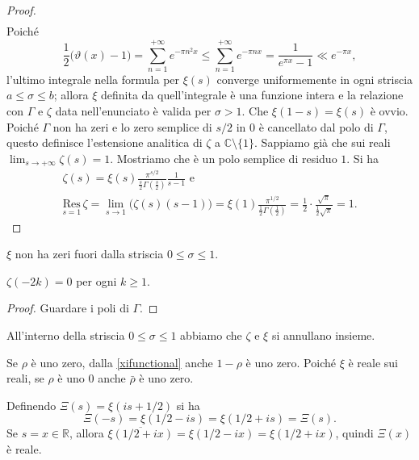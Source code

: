 \begin{proof}
\begin{gather*}
  \end{gather*}
  Poiché
  $$\frac{1}{2}\big(\vartheta(x)-1\big)=\sum_{n=1}^{+\infty} e^{-\pi n^2x} \le \sum_{n=1}^{+\infty} e^{-\pi nx}=\frac{1}{e^{\pi x}-1} \ll e^{-\pi x},$$
  l'ultimo integrale nella formula per $\xi(s)$ converge uniformemente in ogni striscia $a \le \sigma \le b$; allora $\xi$ definita da quell'integrale è una funzione intera e la relazione con $\Gamma$ e $\zeta$ data nell'enunciato è valida per $\sigma>1$. Che $\xi(1-s)=\xi(s)$ è ovvio. Poiché $\Gamma$ non ha zeri e lo zero semplice di $s/2$ in $0$ è cancellato dal polo di $\Gamma$, questo definisce l'estensione analitica di $\zeta$ a $\mathbb{C}\setminus\{1\}$. Sappiamo già che sui reali $\displaystyle \lim_{s \longrightarrow +\infty} \zeta(s)=1$. Mostriamo che è un polo semplice di residuo $1$. Si ha
  \begin{gather*}
    \zeta(s)=\xi(s)\frac{\pi^{s/2}}{\frac{s}{2}\Gamma\left(\frac{s}{2}\right)}\frac{1}{s-1} \text{ e} \\
    \underset{s=1}{\text{Res}}\,\zeta=\lim_{s \longrightarrow 1} \big(\zeta(s)(s-1)\big)=\xi(1)\frac{\pi^{1/2}}{\frac{1}{2}\Gamma\left(\frac{1}{2}\right)}=\frac{1}{2}\cdot\frac{\sqrt{\pi}}{\frac{1}{2}\sqrt{\pi}}=1.
  \end{gather*}
\end{proof}

\begin{oss}
  $\xi$ non ha zeri fuori dalla striscia $0 \le \sigma \le 1$.
\end{oss}

\begin{cor}
  $\zeta(-2k)=0$ per ogni $k \ge 1$.
\end{cor}

\begin{proof}
  Guardare i poli di $\Gamma$.
\end{proof}

\begin{oss}
  All'interno della striscia  $0 \le \sigma \le 1$ abbiamo che $\zeta$ e $\xi$ si annullano insieme.
\end{oss}

\begin{oss}
  Se $\rho$ è uno zero, dalla \eqref{xifunctional} anche $1-\rho$ è uno zero. Poiché $\xi$ è reale sui reali, se $\rho$ è uno $0$ anche $\bar{\rho}$ è uno zero.
\end{oss}

\begin{oss}
  Definendo $\Xi(s)=\xi(is+1/2)$ si ha
  $$\Xi(-s)=\xi(1/2-is)=\xi(1/2+is)=\Xi(s).$$
  Se $s=x \in \mathbb{R}$, allora $\overline{\xi(1/2+ix)}=\xi(1/2-ix)=\xi(1/2+ix)$, quindi $\Xi(x)$ è reale.
\end{oss}

